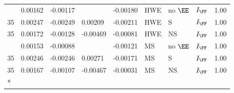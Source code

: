\begin{longtable}[t]{lllllllll}
\addlinespace
35 & 0.00162 & -0.00117 &  & -0.00180 & HWE & no $\EE$ & $I_{\FF}$ & 1.00\\
35 & 0.00247 & -0.00249 & 0.00209 & -0.00211 & HWE & S & $I_{\FF}$ & 1.00\\
35 & 0.00172 & -0.00128 & -0.00469 & -0.00081 & HWE & NS & $I_{\FF}$ & 1.00\\
\addlinespace
35 & 0.00153 & -0.00088 &  & -0.00121 & MS & no $\EE$ & $I_{\FF}$ & 1.00\\
35 & 0.00246 & -0.00246 & 0.00271 & -0.00171 & MS & S & $I_{\FF}$ & 1.00\\
35 & 0.00167 & -0.00107 & -0.00467 & -0.00031 & MS & NS & $I_{\FF}$ & 1.00\\*
\end{longtable}